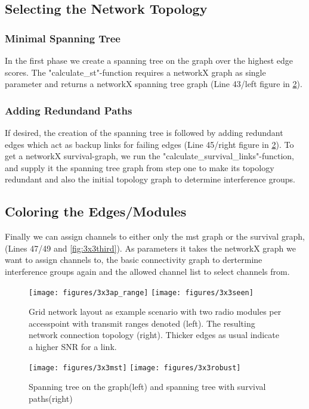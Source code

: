     \subsection{Selecting the Network Topology}
      \subsubsection{Minimal Spanning Tree}
	In the first phase we create a spanning tree on the graph over the highest edge scores.
	The "calculate\_st"-function requires a networkX graph as single parameter and returns a networkX spanning tree graph (Line 43/left figure in \ref{fig:3x3second}).
      \subsubsection{Adding Redundand Paths}
	If desired, the creation of the spanning tree is followed by adding redundant edges which act as backup links 
	for failing edges (Line 45/right figure in \ref{fig:3x3second}). 
	To get a networkX survival-graph, we run the "calculate\_survival\_links"-function,
	and supply it the spanning tree graph from step one to make its topology redundant and also 
	the initial topology graph to determine interference groups.
    \subsection{Coloring the Edges/Modules}
      Finally we can assign channels to either only the mst graph or the survival graph, (Lines 47/49 and \ref{fig:3x3third}).
      As parameters it takes the networkX graph we want to assign channels to, the basic connectivity graph to dertermine 
      interference groups again and the allowed channel list to select channels from. 
      
    \begin{figure}[t]
      \centering
      \texttt{[image: figures/3x3ap\_range]}
      \texttt{[image: figures/3x3seen]}
      \caption{Grid network layout as example scenario with two radio modules per accesspoint with transmit ranges denoted (left). 
	The resulting network connection topology (right). Thicker edges as usual indicate a higher SNR for a link.}
      \label{fig:3x3initial}
    \end{figure}
    
    \begin{figure}[t]
      \centering
      \texttt{[image: figures/3x3mst]}
      \texttt{[image: figures/3x3robust]}
      \caption{Spanning tree on the graph(left) and spanning tree with survival paths(right)}
      \label{fig:3x3second}
    \end{figure}
    
